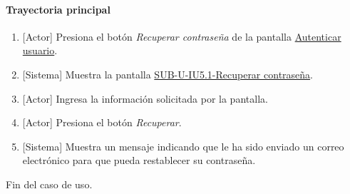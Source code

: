 \paragraph{Trayectoria principal}
	\begin{enumerate}
		\item {[Actor]} Presiona el botón \textit{Recuperar contraseña} de la pantalla \hyperref[fig:sub-u-iu5]{Autenticar usuario}.
		\item {[Sistema]} Muestra la pantalla \hyperref[fig:sub-u-iu5.1]{SUB-U-IU5.1-Recuperar contraseña}.
		\item {[Actor]} Ingresa la información solicitada por la pantalla.
		\item {[Actor]} Presiona el botón \textit{Recuperar}.
		\item {[Sistema]} Muestra un mensaje indicando que le ha sido enviado un correo electrónico para que pueda restablecer su contraseña.
	\end{enumerate}
	Fin del caso de uso.


